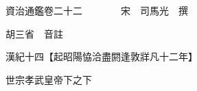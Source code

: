 










 


 
 


 

  
  
  
  
  





  
  
  
  
  
 
  

  

  
  
  



  

 
 

  
   




  

  
  


  　　資治通鑑卷二十二　　　　宋　司馬光　撰

　　胡三省　音註

　　漢紀十四【起昭陽恊洽盡閼逢敦牂凡十二年】

　　世宗孝武皇帝下之下

